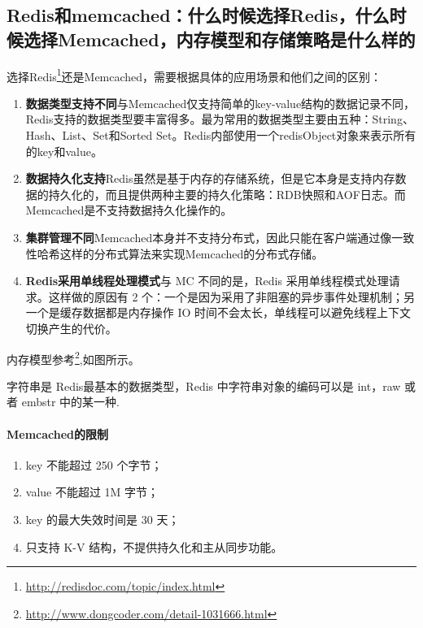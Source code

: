 \documentclass[../../../interview-questions.tex]{subfiles}
\begin{document}
\subsection{Redis和memcached：什么时候选择Redis，什么时候选择Memcached，内存模型和存储策略是什么样的}

选择Redis\footnote{\url{http://redisdoc.com/topic/index.html}}还是Memcached，需要根据具体的应用场景和他们之间的区别：

\begin{enumerate}
\item {\textbf{数据类型支持不同}}与Memcached仅支持简单的key-value结构的数据记录不同，Redis支持的数据类型要丰富得多。最为常用的数据类型主要由五种：String、Hash、List、Set和Sorted Set。Redis内部使用一个redisObject对象来表示所有的key和value。
\item {\textbf{数据持久化支持}}Redis虽然是基于内存的存储系统，但是它本身是支持内存数据的持久化的，而且提供两种主要的持久化策略：RDB快照和AOF日志。而Memcached是不支持数据持久化操作的。
\item {\textbf{集群管理不同}}Memcached本身并不支持分布式，因此只能在客户端通过像一致性哈希这样的分布式算法来实现Memcached的分布式存储。
\item {\textbf{Redis采用单线程处理模式}}与 MC 不同的是，Redis 采用单线程模式处理请求。这样做的原因有 2 个：一个是因为采用了非阻塞的异步事件处理机制；另一个是缓存数据都是内存操作 IO 时间不会太长，单线程可以避免线程上下文切换产生的代价。
\end{enumerate}                                  

内存模型参考\footnote{\url{http://www.dongcoder.com/detail-1031666.html}},如图所示。

字符串是 Redis最基本的数据类型，Redis 中字符串对象的编码可以是 int，raw 或者 embstr 中的某一种.

\paragraph{Memcached的限制}

\begin{enumerate}
    \item {key 不能超过 250 个字节；}
    \item {value 不能超过 1M 字节；}
    \item {key 的最大失效时间是 30 天；}
    \item {只支持 K-V 结构，不提供持久化和主从同步功能。}
\end{enumerate}
\end{document}
